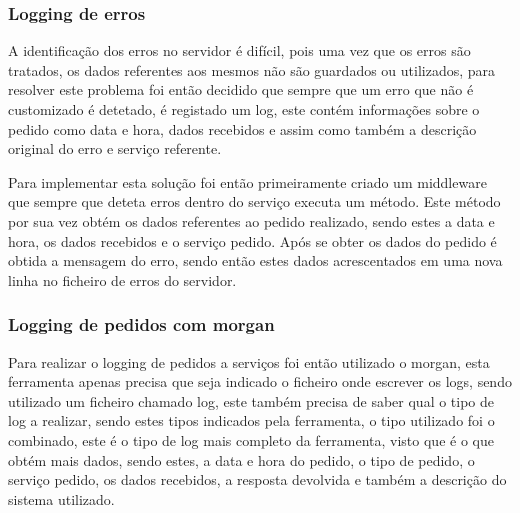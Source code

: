 \subsubsection{Logging de erros}

A identificação dos erros no servidor é difícil, pois uma vez que os erros são tratados, os dados referentes aos mesmos não são guardados ou utilizados, para resolver este problema foi então decidido que sempre que um erro que não é customizado é detetado, é registado um log, este contém informações sobre o pedido como data e hora, dados recebidos e assim como também a descrição original do erro e serviço referente.

Para implementar esta solução foi então primeiramente criado um middleware que sempre que deteta erros dentro do serviço executa um método. Este método por sua vez obtém os dados referentes ao pedido realizado, sendo estes a data e hora, os dados recebidos e o serviço pedido. Após se obter os dados do pedido é obtida a mensagem do erro, sendo então estes dados acrescentados em uma nova linha no ficheiro de erros do servidor.

\subsubsection{Logging de pedidos com morgan}

Para realizar o logging de pedidos a serviços foi então utilizado o morgan, esta ferramenta apenas precisa que seja indicado o ficheiro onde escrever os logs, sendo utilizado um ficheiro chamado log, este também precisa de saber qual o tipo de log a realizar, sendo estes tipos indicados pela ferramenta, o tipo utilizado foi o combinado, este é o tipo de log mais completo da ferramenta, visto que é o que obtém mais dados, sendo estes, a data e hora do pedido, o tipo de pedido, o serviço pedido, os dados recebidos, a resposta devolvida e também a descrição do sistema utilizado.